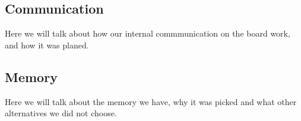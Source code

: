 \subsection{Communication} \label{pcb:design-choices:ss:internal_communication}

Here we will talk about how our internal commmunication on the board work, and how it was planed.

\subsection{Memory} \label{pcb:design-choices:ss:memory}

Here we will talk about the memory we have, why it was picked and what other alternatives we did not choose.
